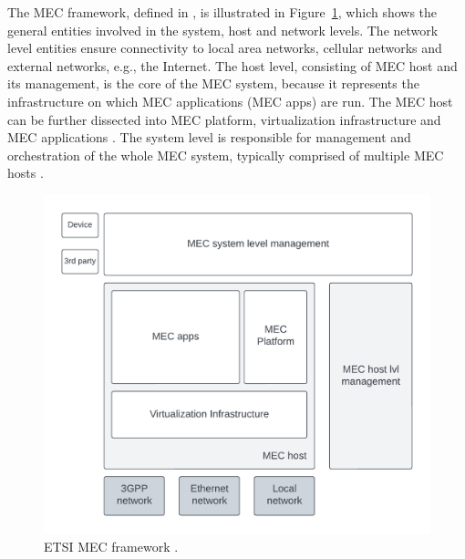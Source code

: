 \documentclass[12pt,a4paper,twoside]{report}
\begin{document}
The MEC framework, defined in \cite{ETSI:GS:MEC003}, is illustrated in Figure~\ref{F:MEC-fw}, which shows the general entities involved in the system, host and network levels. The network level entities ensure connectivity to local area networks, cellular networks and external networks, e.g., the Internet. The host level, consisting of MEC host and its management, is the core of the MEC system, because it represents the infrastructure on which MEC applications (MEC apps) are run. The MEC host can be further dissected into MEC platform, virtualization infrastructure and MEC applications \cite{ETSI:GS:MEC003}. The system level is responsible for management and orchestration of the whole MEC system, typically comprised of multiple MEC hosts \cite{ETSI:GS:MEC003,sabella-mec-sw-dev}. 

\begin{figure}[ht]
	\centering
	\includegraphics[width=12cm]{./images/MEC-framework.pdf}
	\caption{ETSI MEC framework \cite{ETSI:GS:MEC003}.}
	\label{F:MEC-fw}
\end{figure}
\end{document}
